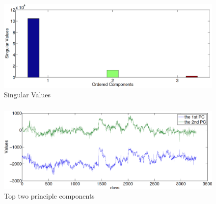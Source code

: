 \documentclass{beamer}
\begin{document}
\begin{frame}
\frametitle{}
\begin{figure}[h!]
  \centering
\includegraphics[scale=0.27]{SingularValuesEarth.png}
  \caption{Singular Values}
\label{fig:singularValuesEarth}
\end{figure}


\end{frame}
\begin{frame}
\frametitle{}
\begin{figure}[h!]
  \centering
\includegraphics[scale=0.28]{FirstTwoPC.png}
  \caption{Top two principle components}
\label{fig:FirstTwoPC}
\end{figure}


\end{frame}
\end{document}
